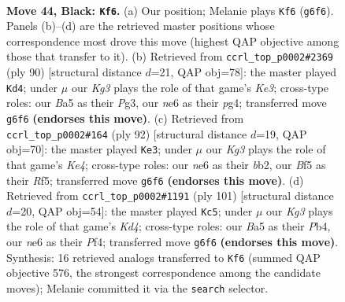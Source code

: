 \documentclass[11pt]{article}
\begin{document}
\clearpage

\begin{figure}[p]\centering
\begin{subfigure}{0.46\textwidth}\centering
\resizebox{\linewidth}{!}{%
\newchessgame
\chessboard[
  setfen={6R1/8/2p1N1k1/bp3b2/8/8/8/5K2 b - - 4 44},
  showmover=false,
  pgfstyle=straightmove, color=movearrow, markmove={g6-f6}
]}
\caption{}
\end{subfigure}\hfill
\begin{subfigure}{0.46\textwidth}\centering
\resizebox{\linewidth}{!}{%
\newchessgame
\chessboard[
  setfen={8/8/p3k3/3n4/6p1/4K1P1/P4B2/8 w - - 6 46},
  showmover=false,
  pgfstyle=straightmove, color=movearrow, markmove={e3-d4}
]}
\caption{}
\end{subfigure}
\\[4pt]
\begin{subfigure}{0.46\textwidth}\centering
\resizebox{\linewidth}{!}{%
\newchessgame
\chessboard[
  setfen={8/8/3k4/5R2/2B1K1r1/1P6/1b6/8 w - - 9 47},
  showmover=false,
  pgfstyle=straightmove, color=movearrow, markmove={e4-e3}
]}
\caption{}
\end{subfigure}\hfill
\begin{subfigure}{0.46\textwidth}\centering
\resizebox{\linewidth}{!}{%
\newchessgame
\chessboard[
  setfen={3R4/7p/8/3k4/1p2bp2/7P/3K2P1/8 b - - 4 51},
  showmover=false,
  pgfstyle=straightmove, color=movearrow, markmove={d5-c5}
]}
\caption{}
\end{subfigure}
\caption{\textbf{Move 44, Black: \texttt{Kf6}.} (a) Our position; Melanie plays \texttt{Kf6} (\texttt{g6f6}). Panels (b)--(d) are the retrieved master positions whose correspondence most drove this move (highest QAP objective among those that transfer to it). (b) Retrieved from \texttt{ccrl\_top\_p0002\#2369} (ply 90) [structural distance $d$=21, QAP obj=78]: the master played \texttt{Kd4}; under $\mu$ our \emph{Kg3} plays the role of that game's \emph{Ke3}; cross-type roles: our \emph{B}a5 as their \emph{P}g3, our \emph{n}e6 as their \emph{p}g4; transferred move \texttt{g6f6} \textbf{(endorses this move)}. (c) Retrieved from \texttt{ccrl\_top\_p0002\#164} (ply 92) [structural distance $d$=19, QAP obj=70]: the master played \texttt{Ke3}; under $\mu$ our \emph{Kg3} plays the role of that game's \emph{Ke4}; cross-type roles: our \emph{n}e6 as their \emph{b}b2, our \emph{B}f5 as their \emph{R}f5; transferred move \texttt{g6f6} \textbf{(endorses this move)}. (d) Retrieved from \texttt{ccrl\_top\_p0002\#1191} (ply 101) [structural distance $d$=20, QAP obj=54]: the master played \texttt{Kc5}; under $\mu$ our \emph{Kg3} plays the role of that game's \emph{Kd4}; cross-type roles: our \emph{B}a5 as their \emph{P}b4, our \emph{n}e6 as their \emph{P}f4; transferred move \texttt{g6f6} \textbf{(endorses this move)}. Synthesis: 16 retrieved analogs transferred to \texttt{Kf6} (summed QAP objective 576, the strongest correspondence among the candidate moves); Melanie committed it via the \texttt{search} selector.}
\label{fig:thought-m87}
\end{figure}
\end{document}
